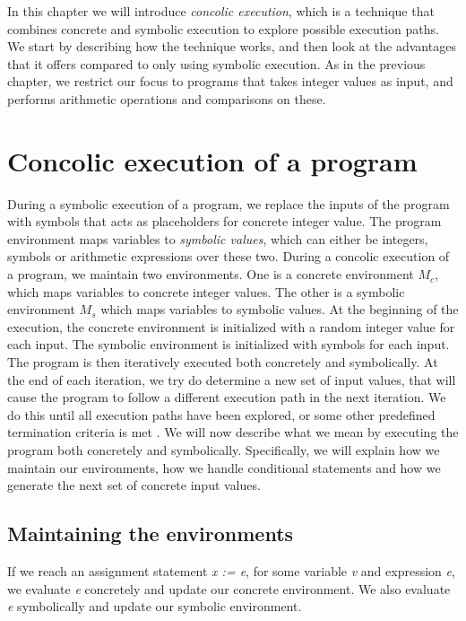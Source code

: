 In this chapter we will introduce \emph{concolic execution}, which is a technique that combines concrete and symbolic execution to explore possible execution paths. We start by describing how the technique works, and then look at the advantages that it offers compared to only using symbolic execution. As in the previous chapter, we restrict our focus to programs that takes integer values as input, and performs arithmetic operations and comparisons on these. 

\section{Concolic execution of a program}
	During a symbolic execution of a program, we replace the inputs of the program with symbols that acts as placeholders for concrete integer value. The program environment maps variables to \emph{symbolic values}, which can either be integers, symbols or arithmetic expressions over these two. During a concolic execution of a program, we maintain two environments. One is a concrete environment $M_c$, which maps variables to concrete integer values. The other is a symbolic environment $M_s$ which maps variables to symbolic values. At the beginning of the execution, the concrete environment is initialized with a random integer value for each input. The symbolic environment is initialized with symbols for each input. 
	The program is then iteratively executed both concretely and symbolically. At the end of each iteration, we try do determine a new set of input values, that will cause the program to follow a different execution path in the next iteration. We do this until all execution paths have been explored, or some other predefined termination criteria is met \cite{Godefroid:2005:DDA:1064978.1065036}. We will now describe what we mean by executing the program both concretely and symbolically. Specifically, we will explain how we maintain our environments, how we handle conditional statements and how we generate the next set of concrete input values.
	
	\subsection{Maintaining the environments} 
	
	If we reach an assignment statement \textsl{x := e}, for some variable \textsl{v} and expression \textsl{e}, we evaluate \textsl{e} concretely and update our concrete environment. We also evaluate \textsl{e} symbolically and update our symbolic environment. 
	
